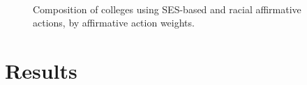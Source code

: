 \begin{figure}
  \centering
   \\
  \caption{Composition of colleges using SES-based and racial affirmative actions, by affirmative action weights.}
  \label{fig:A45}
\end{figure}

\section{Results}\label{sec:results}

